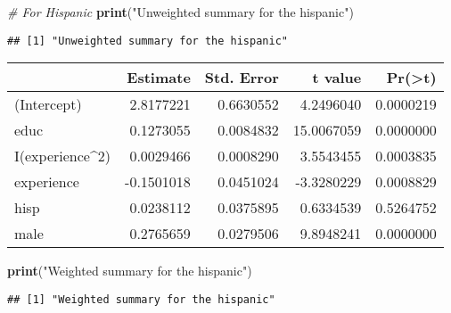 \documentclass[
]{article}
\newenvironment{Shaded}{\begin{snugshade}}{\end{snugshade}}
\newcommand{\CommentTok}[1]{\textcolor[rgb]{0.56,0.35,0.01}{\textit{#1}}}
\newcommand{\DataTypeTok}[1]{\textcolor[rgb]{0.13,0.29,0.53}{#1}}
\newcommand{\DecValTok}[1]{\textcolor[rgb]{0.00,0.00,0.81}{#1}}
\newcommand{\KeywordTok}[1]{\textcolor[rgb]{0.13,0.29,0.53}{\textbf{#1}}}
\newcommand{\NormalTok}[1]{#1}
\newcommand{\OperatorTok}[1]{\textcolor[rgb]{0.81,0.36,0.00}{\textbf{#1}}}
\newcommand{\StringTok}[1]{\textcolor[rgb]{0.31,0.60,0.02}{#1}}
\begin{document}
\begin{Shaded}
\begin{Highlighting}[]
\CommentTok{# For Hispanic}
\KeywordTok{print}\NormalTok{(}\StringTok{"Unweighted summary for the hispanic"}\NormalTok{)}
\end{Highlighting}
\end{Shaded}

\begin{verbatim}
## [1] "Unweighted summary for the hispanic"
\end{verbatim}

\begin{Shaded}
\end{Shaded}

\begin{longtable}[]{@{}lrrrr@{}}
\toprule
& Estimate & Std. Error & t value &
Pr(\textgreater{}\textbar{}t\textbar{})\tabularnewline
\midrule
\endhead
(Intercept) & 2.8177221 & 0.6630552 & 4.2496040 &
0.0000219\tabularnewline
educ & 0.1273055 & 0.0084832 & 15.0067059 & 0.0000000\tabularnewline
I(experience\^{}2) & 0.0029466 & 0.0008290 & 3.5543455 &
0.0003835\tabularnewline
experience & -0.1501018 & 0.0451024 & -3.3280229 &
0.0008829\tabularnewline
hisp & 0.0238112 & 0.0375895 & 0.6334539 & 0.5264752\tabularnewline
male & 0.2765659 & 0.0279506 & 9.8948241 & 0.0000000\tabularnewline
\bottomrule
\end{longtable}

\begin{Shaded}
\begin{Highlighting}[]
\KeywordTok{print}\NormalTok{(}\StringTok{"Weighted summary for the hispanic"}\NormalTok{)}
\end{Highlighting}
\end{Shaded}

\begin{verbatim}
## [1] "Weighted summary for the hispanic"
\end{verbatim}
\end{document}
